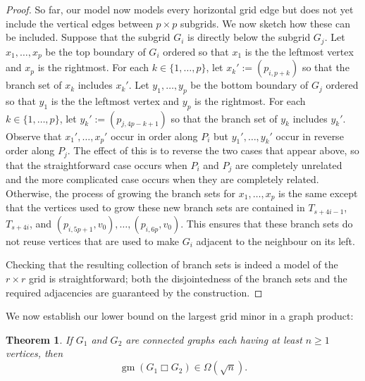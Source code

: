 \documentclass{patmorin}
\newcommand{\boxprod}{\mathbin{\Box}}
\renewcommand{\ge}{\geqslant}
\DeclareMathOperator{\gm}{gm}
\theoremstyle{plain}
\newtheorem{thm}{Theorem}
\theoremstyle{definition}
\begin{document}
\begin{proof}
  So far, our model now models every horizontal grid edge but does not yet include the vertical edges between $p\times p$ subgrids.  We now sketch how these can be included.  Suppose that the subgrid $G_i$ is directly below the subgrid $G_j$.  Let $x_1,\ldots,x_p$ be the top boundary of $G_i$ ordered so that $x_1$ is the the leftmost vertex and $x_p$ is the rightmost.  For each $k\in\{1,\ldots,p\}$, let $x_k':=(p_{i,p+k})$ so that the branch set of $x_k$ includes $x_k'$.  Let $y_1,\ldots,y_p$ be the bottom boundary of $G_j$ ordered so that $y_1$ is the the leftmost vertex and $y_p$ is the rightmost.  For each $k\in\{1,\ldots,p\}$, let $y_k':=(p_{j,4p-k+1})$ so that the branch set of $y_k$ includes $y_k'$.  Observe that $x_1',\ldots,x_p'$ occur in order along $P_{i}$ but $y_1',\ldots,y_k'$ occur in reverse order along $P_j$.  The effect of this is to reverse the two cases that appear above, so that the straightforward case occurs when $P_i$ and $P_j$ are completely unrelated and the more complicated case occurs when they are completely related.  Otherwise, the process of growing the branch sets for $x_1,\ldots,x_p$ is the same except that the vertices used to grow these new branch sets are contained in $T_{s+4i-1}$, $T_{s+4i}$, and $(p_{i,5p+1},v_0),\ldots,(p_{i,6p},v_0)$.  This ensures that these branch sets do not reuse vertices that are used to make $G_i$ adjacent to the neighbour on its left.

  Checking that the resulting collection of branch sets is indeed a model of the $r\times r$ grid is straightforward; both the disjointedness of the branch sets and the required adjacencies are guaranteed by the construction.
\end{proof}

We now establish our lower bound on the largest grid minor in a graph product:

\begin{thm}\label{lower_bound}
  If $G_1$ and $G_2$ are connected graphs each having at least $n\ge 1$ vertices, then $$\gm(G_1\boxprod G_2)\in\Omega(\sqrt{n}).$$
\end{thm}
\end{document}
